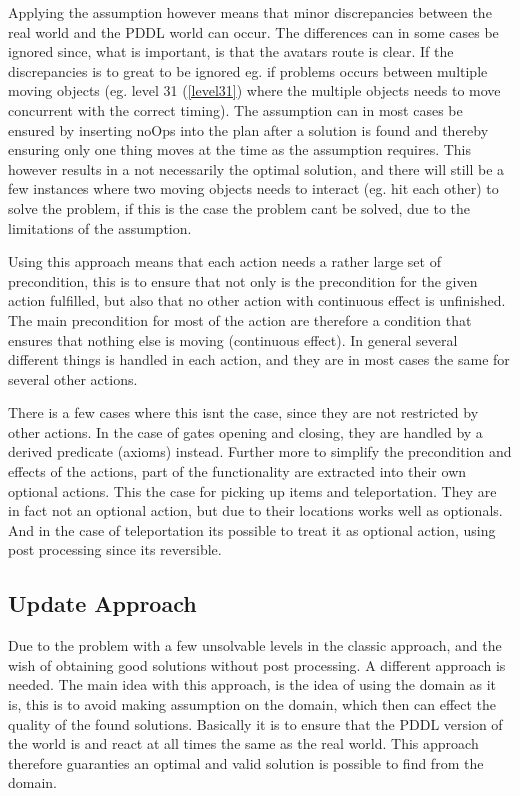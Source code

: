 		Applying the assumption however means that minor discrepancies between the real world and the PDDL world can occur. The differences can in some cases be ignored since, what is important, is that the avatars route is clear. If the discrepancies is to great to be ignored eg. if problems occurs between multiple moving objects (eg. level 31 (\ref{level31}) where the multiple objects needs to move concurrent with the correct timing). The assumption can in most cases be ensured by inserting noOps into the plan after a solution is found and thereby ensuring only one thing moves at the time as the assumption requires. This however results in a not necessarily the optimal solution, and there will still be a few instances where two moving objects needs to interact (eg. hit each other) to solve the problem, if this is the case the problem cant be solved, due to the limitations of the assumption.
			
		Using this approach means that each action needs a rather large set of precondition, this is to ensure that not only is the precondition for the given action fulfilled, but also that no other action with continuous effect is unfinished. The main precondition for most of the action are therefore a condition that ensures that nothing else is moving (continuous effect). In general several different things is handled in each action, and they are in most cases the same for several other actions. %
		
		There is a few cases where this isnt the case, since they are not restricted by other actions. In the case of gates opening and closing, they are handled by a derived predicate (axioms) instead. 
		Further more to simplify the precondition and effects of the actions, part of the functionality are extracted into their own optional actions. This the case for picking up items and teleportation. They are in fact not an optional action, but due to their locations works well as optionals. And in the case of teleportation its possible to treat it as optional action, using post processing since its reversible.
		
		\subsection{Update Approach}
		Due to the problem with a few unsolvable levels in the classic approach, and the wish of obtaining good solutions without post processing. A different approach is needed. The main idea with this approach, is the idea of using the domain as it is, this is to avoid making assumption on the domain, which then can effect the quality of the found solutions. Basically it is to ensure that the PDDL version of the world is and react at all times the same as the real world. This approach therefore guaranties an optimal and valid solution is possible to find from the domain.
		
